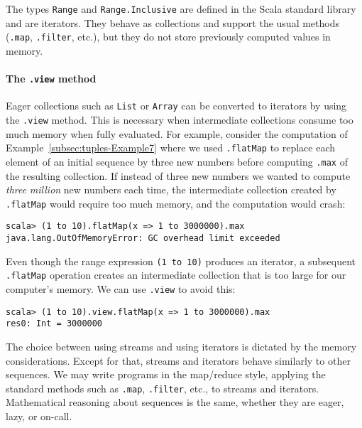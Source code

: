 The types \lstinline!Range!
and \lstinline!Range.Inclusive!
are defined in the Scala standard library and are iterators. They
behave as collections and support the usual methods (\lstinline!.map!,
\lstinline!.filter!, etc.),
but they do not store previously computed values in memory.

\paragraph{The \texttt{.view} method}

Eager collections such as \lstinline!List!
or \lstinline!Array! can
be converted to iterators by using the \lstinline!.view!
method. This is necessary when intermediate collections consume too
much memory when fully evaluated. For example, consider the computation
of Example~\ref{subsec:tuples-Example7} where we used \lstinline!.flatMap!
to replace each element of an initial sequence by three new numbers
before computing \lstinline!.max!
of the resulting collection. If instead of three new numbers we wanted
to compute \emph{three} \emph{million} new numbers each time, the
intermediate collection created by \lstinline!.flatMap!
would require too much memory, and the computation would crash:
\begin{lstlisting}
scala> (1 to 10).flatMap(x => 1 to 3000000).max
java.lang.OutOfMemoryError: GC overhead limit exceeded
\end{lstlisting}
Even though the range expression \lstinline!(1 to 10)!
produces an iterator, a subsequent \lstinline!.flatMap!
operation creates an intermediate collection that is too large for
our computer's memory. We can use \lstinline!.view!
to avoid this:
\begin{lstlisting}
scala> (1 to 10).view.flatMap(x => 1 to 3000000).max
res0: Int = 3000000
\end{lstlisting}
The choice between using streams and using iterators is dictated by
the memory considerations. Except for that, streams and iterators
behave similarly to other sequences. We may write programs in the
map/reduce style, applying the standard methods such as \lstinline!.map!,
\lstinline!.filter!, etc.,
to streams and iterators. Mathematical reasoning about sequences is
the same, whether they are eager, lazy, or on-call.

